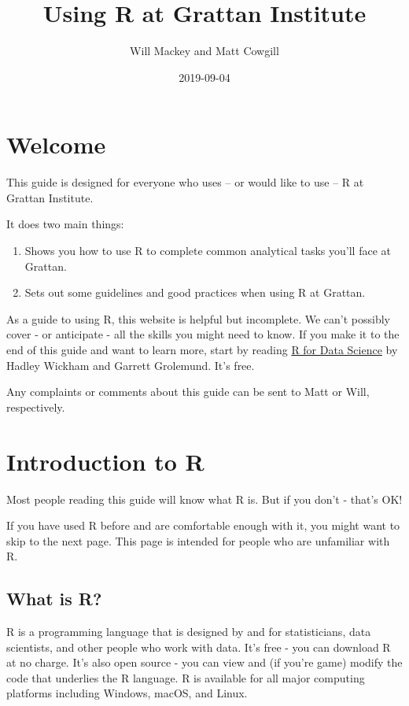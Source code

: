 \documentclass[]{book}
\title{Using R at Grattan Institute}
\author{Will Mackey and Matt Cowgill}
\date{2019-09-04}
\providecommand{\tightlist}{%
  \setlength{\itemsep}{0pt}\setlength{\parskip}{0pt}}
\begin{document}
\maketitle

{
\setcounter{tocdepth}{1}
\tableofcontents
}
\hypertarget{welcome}{%
\chapter*{Welcome}\label{welcome}}

This guide is designed for everyone who uses -- or would like to use -- R at Grattan Institute.

It does two main things:

\begin{enumerate}
\def\labelenumi{\arabic{enumi}.}
\tightlist
\item
  Shows you how to use R to complete common analytical tasks you'll face at Grattan.
\item
  Sets out some guidelines and good practices when using R at Grattan.
\end{enumerate}

As a guide to using R, this website is helpful but incomplete. We can't possibly cover - or anticipate - all the skills you might need to know. If you make it to the end of this guide and want to learn more, start by reading \href{https://r4ds.had.co.nz}{R for Data Science} by Hadley Wickham and Garrett Grolemund. It's free.

Any complaints or comments about this guide can be sent to Matt or Will, respectively.

\hypertarget{introduction-to-r}{%
\chapter{Introduction to R}\label{introduction-to-r}}

Most people reading this guide will know what R is. But if you don't - that's OK!

If you have used R before and are comfortable enough with it, you might want to skip to the next page. This page is intended for people who are unfamiliar with R.

\hypertarget{what-is-r}{%
\section{What is R?}\label{what-is-r}}

R is a programming language that is designed by and for statisticians, data scientists, and other people who work with data. It's free - you can download R at no charge. It's also open source - you can view and (if you're game) modify the code that underlies the R language. R is available for all major computing platforms including Windows, macOS, and Linux.
\end{document}
